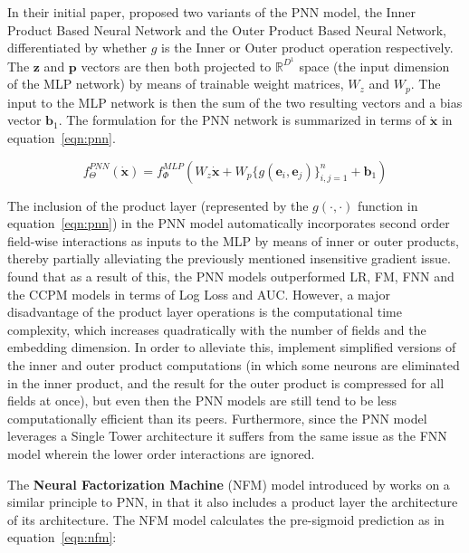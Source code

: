 \documentclass{mldsmsc}
\begin{document}
In their initial paper, \cite{RefWorks:qu2016product-based} proposed two variants of the PNN model, the Inner Product Based Neural Network
and the Outer Product Based Neural Network, differentiated by whether $g$ is the Inner or Outer
product operation respectively. The $\mathbf{z}$ and $\mathbf{p}$ vectors are then both
projected to $\mathbb{R}^{D^1}$ space (the input dimension of the MLP network) by means
of trainable weight matrices, $W_z$ and $W_p$. The input to the MLP network is then the
sum of the two resulting vectors and a bias vector $\mathbf{b}_1$. The formulation
for the PNN network is summarized in terms of $\dot{\mathbf{x}}$ in equation~\ref{eqn:pnn}.

\begin{equation}\label{eqn:pnn}
    f_{\Theta}^{PNN}(\dot{\mathbf{x}}) = f_{\Phi}^{MLP}(W_z \dot{\mathbf{x}} + W_p \{g(\mathbf{e}_i, \mathbf{e}_j)\}_{i,j=1}^{n} + \mathbf{b}_1)
\end{equation}

The inclusion of the product layer (represented by the $g(\cdot, \cdot)$ function in equation~\ref{eqn:pnn}) in the PNN model automatically incorporates second order field-wise
interactions as inputs to the MLP by means of inner or outer products, thereby partially alleviating
the previously mentioned insensitive gradient issue. \cite{RefWorks:qu2016product-based} found that
as a result of this, the PNN models outperformed LR, FM, FNN and the CCPM models in terms of Log Loss
and AUC. However, a major disadvantage of the product layer operations is the computational time complexity,
which increases quadratically with the number of fields and the embedding dimension. In order to alleviate
this, \cite{RefWorks:qu2016product-based} implement simplified versions of the inner and outer product
computations (in which some neurons are eliminated in the inner product, and the result for the outer product
is compressed for all fields at once), but even then the PNN models are still tend to be less computationally efficient
than its peers. Furthermore, since the PNN model leverages a Single Tower architecture it suffers from the
same issue as the FNN model wherein the lower order interactions are ignored.

The \textbf{Neural Factorization Machine} (NFM) model introduced by \cite{RefWorks:he2017neural} works
on a similar principle to PNN, in that it also includes a product layer the architecture
of its architecture. The NFM model calculates the pre-sigmoid prediction as
in equation~\ref{eqn:nfm}:
\end{document}
